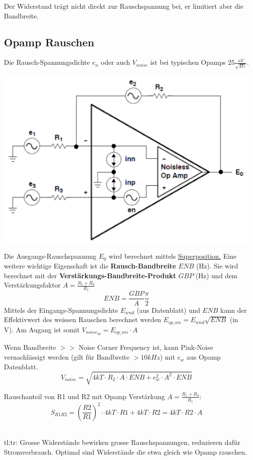 Der Widerstand trägt nicht direkt zur Rauschspannung bei, er limitiert aber die Bandbreite.

\subsection{Opamp Rauschen}
Die Rausch-Spannungsdichte $e_n$ oder auch $V_{noise}$ ist bei typischen Opamps $25\frac{nV}{\sqrt{Hz}}$.
\begin{center}
	\includegraphics[width=0.6\columnwidth]{Images/opamp_rauschen}
\end{center}
Die Ausgangs-Rauschspannung $E_0$ wird berechnet mittels \underline{Superposition.} Eine weitere wichtige Eigenschaft ist die \textbf{Rausch-Bandbreite} $ENB$ (Hz). Sie wird berechnet mit der \textbf{Verstärkungs-Bandbreite-Produkt} $GBP$ (Hz) und dem Verstärkungsfaktor $A = \frac{R_1 + R_3}{R_1}$
\[
ENB = \frac{GBP}{A}\frac{\pi}{2}
\]
Mittels der Eingangs-Spannungsdichte $E_{wnd}$ (aus Datenblatt) und $ENB$ kann der Effektivwert des weissen Rauschen berechnet werden $E_{op\_wn} = E_{wnd}\sqrt{ENB}$ (in V). Am Augang ist somit $V_{noise_{op}} = E_{op\_wn} \cdot A$

Wenn Bandbreite $>>$ Noise Corner Frequency ist, kann Pink-Noise vernachlässigt werden (gilt für Bandbreite $>10kHz$) mit $e_w$ aus Opamp Datenblatt.
\[
V_{noise} = \sqrt{4kT\cdot R_2\cdot A\cdot ENB + e_{w}^2 \cdot A^2 \cdot ENB}
\]

Rauschanteil von R1 und R2 mit Opamp Verstärkung $A = \frac{R_1 + R_3}{R_1}$:
\[
S_{R1R2} = \left(\frac{R2}{R1}\right)^2\cdot 4kT \cdot R1 + 4kT \cdot R2 = 4kT \cdot R2\cdot A
\]

~\\
tl;tr: Grosse Widerstände bewirken grosse Rauschspannungen, reduzieren dafür Stromverbrauch. Optimal sind Widerstände die etwa gleich wie Opamp rauschen.


